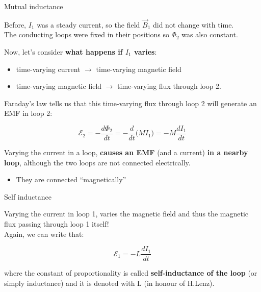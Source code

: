 \begin{frame}{Mutual inductance}

Before, $I_1$ was a steady current, so the field $\vec{B}_1$ did not change with time.\\
The conducting loops were fixed in their positions so $\Phi_2$ was also constant.\\

\vspace{0.3cm}

Now, let’s consider {\bf what happens if $I_1$ varies}:
\begin{itemize}
   \item  time-varying current $\rightarrow$ time-varying magnetic field
   \item  time-varying magnetic field $\rightarrow$  time-varying flux through loop 2.
\end{itemize}

\vspace{0.3cm}

Faraday's law tells us that this time-varying flux through loop 2 will
generate an EMF in loop 2:

\begin{equation*}
  \mathcal{E}_2 = - \frac{d\Phi_2}{dt} = - \frac{d}{dt} \Big( M I_1 \Big) = - M \frac{dI_1}{dt}
\end{equation*}

\vspace{0.2cm}

Varying the current in a loop, {\bf causes an EMF} (and a current) {\bf in a nearby loop},
although the two loops are not connected electrically.
\begin{itemize}
   \item They are connected ``magnetically''
\end{itemize}

\end{frame}



%
%
%

\begin{frame}{Self inductance}

Varying the current in loop 1, varies the magnetic field and thus the magnetic
flux passing through loop 1 itself!\\

\vspace{0.3cm}
Again, we can write that:

\begin{equation*}
  \mathcal{E}_1 = - L \frac{dI_1}{dt}
\end{equation*}

where the constant of proportionality is called {\bf self-inductance of the loop}
(or simply inductance) and it is denoted with L (in honour of H.Lenz).

\end{frame}


